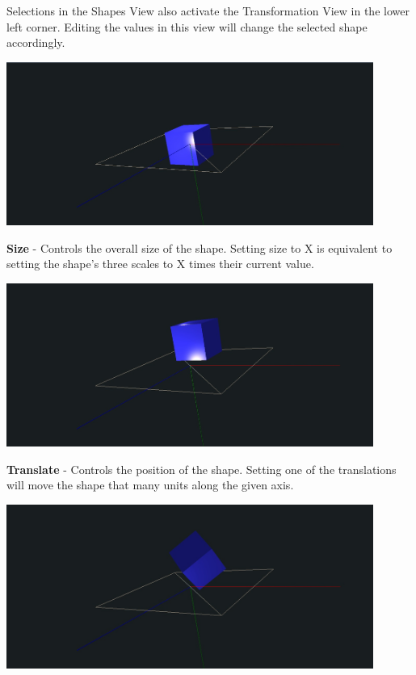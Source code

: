 \documentclass{article}
\begin{document}
Selections in the Shapes View also activate the Transformation View in the lower
left corner. Editing the values in this view will change the selected shape
accordingly.

\begin{center}
\includegraphics[width=12cm]{images/GeometryCubeSize.jpg}
\end{center}

\textbf{Size} - Controls the overall size of the shape. Setting size to X is
equivalent to setting the shape's three scales to X times their current value.

\begin{center}
\includegraphics[width=12cm]{images/GeometryCubeTranslate.jpg}
\end{center}

\textbf{Translate} - Controls the position of the shape. Setting one of the
translations will move the shape that many units along the given axis.

\begin{center}
\includegraphics[width=12cm]{images/GeometryCubeRotate.jpg}
\end{center}
\end{document}
